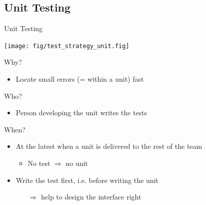 \subsection{Unit Testing}
\begin{frame}{Unit Testing}
  \centerline{\texttt{[image: fig/test\_strategy\_unit.fig]}}
  \begin{block}{Why?}
    \begin{itemize}
    \item Locate small errors (= within a unit) fast
    \end{itemize}
  \end{block}\vspace{-.5\baselineskip}
  \begin{block}{Who?}
    \begin{itemize}
    \item Person developing the unit writes the tests
    \end{itemize}
  \end{block}\vspace{-.5\baselineskip}
  \begin{block}{When?}
    \begin{itemize}
    \item At the latest when a unit is delivered to the rest of the team
      \begin{itemize}
      \item No test $\Rightarrow$ no unit
      \end{itemize}
    \item Write the test first, i.e. before writing the unit
      \begin{itemize}
      \item[$\Rightarrow$] help to design the interface right
      \end{itemize}
    \end{itemize}    
  \end{block}
\end{frame}
